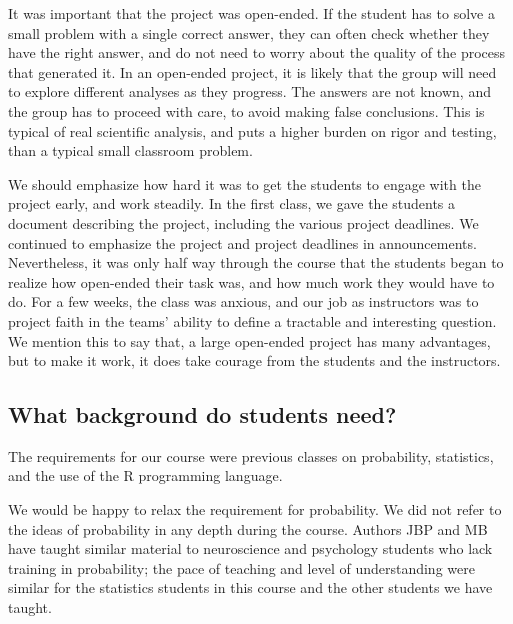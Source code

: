 It was important that the project was open-ended.  If the student has to solve
a small problem with a single correct answer, they can often check
whether they have the right answer, and do not need to worry about the quality
of the process that generated it.  In an open-ended project, it is likely that
the group will need to explore different analyses as they progress.  The
answers are not known, and the group has to proceed with care, to avoid making
false conclusions.  This is typical of real scientific analysis, and puts a
higher burden on rigor and testing, than a typical small classroom problem.

We should emphasize how hard it was to get the students to engage with the
project early, and work steadily.  In the first class, we gave the students a
document describing the project, including the various project deadlines.  We
continued to emphasize the project and project deadlines in announcements.
Nevertheless, it was only half way through the course that the students began
to realize how open-ended their task was, and how much work they would have to
do.  For a few weeks, the class was anxious, and our job as instructors was to
project faith in the teams' ability to define a tractable and interesting
question.  We mention this to say that, a large open-ended project has many
advantages, but to make it work, it does take courage from the students
and the instructors.

\subsection{What background do students need?}

The requirements for our course were previous classes on probability,
statistics, and the use of the R programming language.

We would be happy to relax the requirement for probability.  We did not refer
to the ideas of probability in any depth during the course.  Authors JBP and
MB have taught similar material to neuroscience and psychology students who
lack training in probability; the pace of teaching and level of understanding
were similar for the statistics students in this course and the other
students we have taught.

